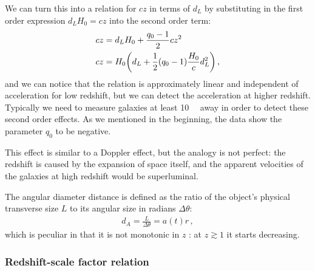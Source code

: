 \documentclass[main.tex]{subfiles}
\begin{document}
We can turn this into a relation for \(cz\) in terms of \(d_L\) by substituting in the first order expression \(d_L H_0 = cz\) into the second order term:
\begin{align}
cz &= d_L H_0 + \frac{q_0 -1}{2} cz^2 \\
cz &= H_0 \qty(d_L + \frac{1}{2} (q_0 -1 ) \frac{H_0}{c} d_L^2)\,,
\end{align}
%
and we can notice that the relation is approximately linear and independent of acceleration for low redshift, but we can detect the acceleration at higher redshift.
Typically we need to measure galaxies at least \SI{10}{\mega\parsec} away in order to detect these second order effects.
As we mentioned in the beginning, the data show the parameter \(q_0 \) to be negative.

This effect is similar to a Doppler effect, but the analogy is not perfect: the redshift is caused by the expansion of space itself, and the apparent velocities of the galaxies at high redshift would be superluminal. 


\begin{definition}
The angular diameter distance is defined as the ratio of the object's physical transverse size \(L\) to its angular size in radians \(\Delta \theta \): 
%
\begin{align}
d_A = \frac{L}{\Delta \theta } = a(t) r
\,,
\end{align}
%
which is peculiar in that it is not monotonic in \(z\) \cite{hoggDistanceMeasuresCosmology2000}: at \(z \gtrsim 1\) it starts decreasing.
\end{definition}


\subsubsection{Redshift-scale factor relation}
\end{document}
